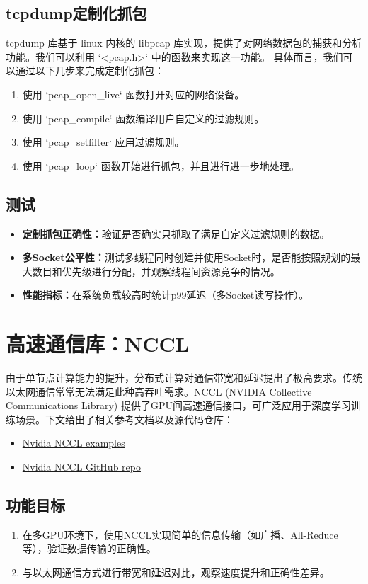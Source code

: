 \subsection{tcpdump定制化抓包}
tcpdump 库基于 linux 内核的 libpcap 库实现，提供了对网络数据包的捕获和分析功能。我们可以利用 `<pcap.h>` 中的函数来实现这一功能。
具体而言，我们可以通过以下几步来完成定制化抓包：
\begin{enumerate}
    \item 使用 `pcap\_open\_live` 函数打开对应的网络设备。
    \item 使用 `pcap\_compile` 函数编译用户自定义的过滤规则。
    \item 使用 `pcap\_setfilter` 应用过滤规则。
    \item 使用 `pcap\_loop` 函数开始进行抓包，并且进行进一步地处理。
\end{enumerate}

\subsection{测试}
\begin{itemize}
    \item \textbf{定制抓包正确性：}验证是否确实只抓取了满足自定义过滤规则的数据。  
    \item \textbf{多Socket公平性：}测试多线程同时创建并使用Socket时，是否能按照规划的最大数目和优先级进行分配，并观察线程间资源竞争的情况。
    \item \textbf{性能指标：}在系统负载较高时统计p99延迟（多Socket读写操作）。
\end{itemize}

\section{高速通信库：NCCL}
由于单节点计算能力的提升，分布式计算对通信带宽和延迟提出了极高要求。传统以太网通信常常无法满足此种高吞吐需求。NCCL (NVIDIA Collective Communications Library) 提供了GPU间高速通信接口，可广泛应用于深度学习训练场景。下文给出了相关参考文档以及源代码仓库：
\begin{itemize}
    \item \href{https://docs.nvidia.com/deeplearning/nccl/user-guide/docs/examples.html#communicator-creation-and-destruction-examples}{Nvidia NCCL examples}
    \item \href{https://github.com/NVIDIA/nccl}{Nvidia NCCL GitHub repo}
\end{itemize}

\subsection{功能目标}
\begin{enumerate}
    \item 在多GPU环境下，使用NCCL实现简单的信息传输（如广播、All-Reduce等），验证数据传输的正确性。
    \item 与以太网通信方式进行带宽和延迟对比，观察速度提升和正确性差异。
\end{enumerate}

